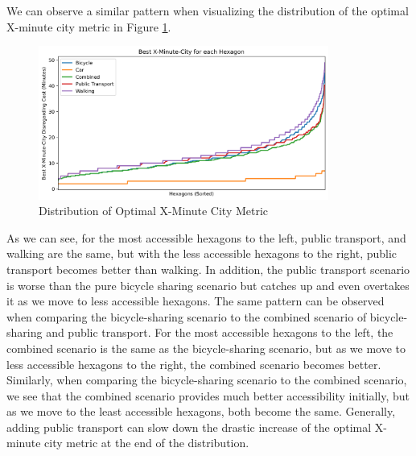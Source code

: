 We can observe a similar pattern when visualizing the distribution of the optimal X-minute city metric in Figure \ref{fig:optimal_x_minute_city_metric}.
\begin{figure}
  \begin{center}
    \includegraphics[width=0.85\textwidth]{Figures/results/minute_city_metric/best_x_minute_city}
  \end{center}
  \caption{Distribution of Optimal X-Minute City Metric}
  \label{fig:optimal_x_minute_city_metric}
\end{figure}
As we can see, for the most accessible hexagons to the left, public transport, and walking are the same, but with the less accessible hexagons to the right, public transport becomes better than walking.
In addition, the public transport scenario is worse than the pure bicycle sharing scenario but catches up and even overtakes it as we move to less accessible hexagons.
The same pattern can be observed when comparing the bicycle-sharing scenario to the combined scenario of bicycle-sharing and public transport.
For the most accessible hexagons to the left, the combined scenario is the same as the bicycle-sharing scenario, but as we move to less accessible hexagons to the right, the combined scenario becomes better.
Similarly, when comparing the bicycle-sharing scenario to the combined scenario, we see that the combined scenario provides much better accessibility initially, but as we move to the least accessible hexagons, both become the same.
Generally, adding public transport can slow down the drastic increase of the optimal X-minute city metric at the end of the distribution.


